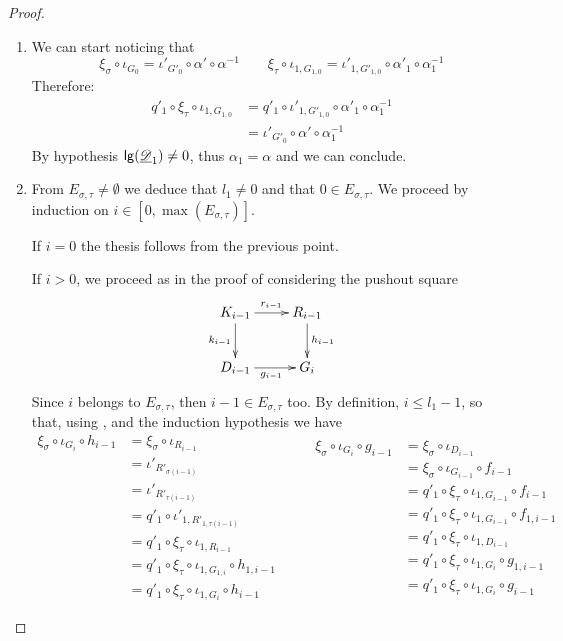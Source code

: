 \begin{proof}
\begin{enumerate}
		
		\item We can start noticing that
		\[\xi_\sigma \circ \iota_{G_0}=\iota'_{G'_0}\circ \alpha'\circ \alpha^{-1} \qquad \xi_{\tau} \circ \iota_{1,G_{1,0}}= \iota'_{1, G'_{1,0}} \circ \alpha'_1\circ \alpha^{-1}_1\] 
		Therefore:
		\begin{align*}
		q'_1\circ \xi_{\tau} \circ \iota_{1, G_{1,0}}&=q'_1 \circ \iota'_{1, G'_{1,0}} \circ \alpha'_1\circ \alpha^{-1}_1\\ &= \iota'_{G'_{0}}\circ \alpha' \circ \alpha^{-1}_1
		\end{align*}
		By hypothesis $\mathsf{lg}(\underline{\mathscr{D}}_1) \neq 0$, thus $\alpha_1=\alpha$ and we can conclude.
		
		\item  From $E_{\sigma, \tau}\neq \emptyset$ we deduce that $l_1\neq 0$ and that $0\in E_{\sigma, \tau}$.   We proceed by induction on $i\in [0,\max(E_{\sigma, \tau})]$. 

\smallskip \noindent  If $i=0$ the thesis follows from the previous point.

\smallskip \noindent If $i>0$, we proceed as in the proof of  considering the pushout square
			\[\xymatrix{K_{i-1}\ar[r]^{r_{i-1}} \ar[d]_{k_{i-1}}& R_{i-1} \ar[d]^{h_{i-1}}\\ D_{i-1} \ar[r]_{g_{i-1}}& G_i}\] 
		Since $i$ belongs to $E_{\sigma, \tau}$, then $i-1\in E_{\sigma, \tau}$ too. By definition, $i\leq l_1-1$, so that, using ,  and the induction hypothesis we have
			\[\begin{split}
				\xi_\sigma \circ \iota_{G_i}\circ h_{i-1}&=  \xi_\sigma\circ \iota_{R_{i-1}}\\&=\iota'_{R'_{\sigma(i-1)}}\\&=\iota'_{R'_{\tau(i-1)}}\\&=q'_1\circ \iota'_{1, R'_{1,\tau(i-1)}}\\&=q'_1\circ \xi_{\tau}\circ \iota_{1, R_{i-1}}\\&=q'_1\circ \xi_{\tau} \circ \iota_{1, G_{1,i}}\circ h_{1, i-1}\\&=q'_1\circ \xi_\tau \circ \iota_{1, G_i} \circ h_{i-1}
			\end{split} \qquad  \begin{split}
			\xi_\sigma \circ \iota_{G_i}\circ g_{i-1}&=\xi_{\sigma}\circ \iota_{D_{i-1}}\\&=\xi_{\sigma}\circ \iota_{G_{i-1}} \circ f_{i-1}\\&=q'_1 \circ \xi_{\tau} \circ \iota_{1, G_{i-1}} \circ f_{i-1}\\&=q'_1 \circ \xi_{\tau} \circ \iota_{1, G_{i-1}} \circ f_{1, i-1}\\&=q'_1 \circ \xi_{\tau} \circ \iota_{1, D_{i-1}}\\&=q'_1 \circ \xi_{\tau} \circ \iota_{1, G_i}\circ g_{1, i-1}\\&=q'_1 \circ \xi_{\tau} \circ \iota_{1, G_i}\circ g_{i-1}
			\end{split}\]
	

\end{enumerate}
\end{proof}
